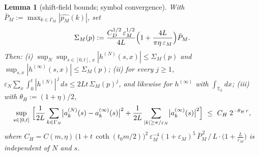\documentclass[11pt,a4paper]{article}
\theoremstyle{plain}
\newtheorem{lemma}[theorem]{Lemma}
\theoremstyle{definition}
\newcommand{\T}{\mathbb{T}}
\newcommand{\eps}{\varepsilon}
\DeclareMathOperator{\cth}{coth}
\begin{document}
\begin{lemma}[shift-field bounds; symbol convergence]
\label{lem:H}
With $\bar P_M:=\max_{k\in\Gamma_M}|\widehat{p_M}(k)|$, set
\[
 \Sigma_M(p):=\frac{C_D^{1/2}\,\eps_M^{1/2}}{4L}
 \Bigl(1+\frac{4L}{\pi\eta\,\eps_M}\Bigr)\bar P_M .
\]
Then:
\emph{(i)} $\sup_N\sup_{s\in[0,t],\,x}|h^{(N)}(s,x)|\le\Sigma_M(p)$ and
$\sup_{s,x}|h^{(\infty)}(s,x)|\le\Sigma_M(p)$;
\emph{(ii)} for every $j\ge1$,
$\eps_N\sum_{x}\int_0^t|h^{(N)}|^{\,j}\,ds\le2Lt\,\Sigma_M(p)^j$,
and likewise for $h^{(\infty)}$ with $\int_{\T_L}dx$;
\emph{(iii)} with $\theta_H:=(1+\eta)/2$,
\[
 \sup_{s\in[0,t]}\ \Bigl[\frac1{2L}\sum_{k\in\Gamma_N}
 \bigl|a^{(N)}_k(s)-a^{(\infty)}_k(s)\bigr|^2
 +\frac1{2L}\sum_{|k|\ge\pi/\eps_N}\bigl|a^{(\infty)}_k(s)\bigr|^2\Bigr]
 \ \le\ C_H\;2^{-\theta_H\,r},
\]
where $C_H=C(m,\eta)\,\bigl(1+t\,\cth(t_0m/2)\bigr)^2\,
\eps_M^{-4}(1+\eps_M)^{5}\,\bar P_M^{\,2}\,/\,L\cdot
\bigl(1+\tfrac L{\eps_M}\bigr)$ is independent of $N$ and $s$.
\end{lemma}
\end{document}
